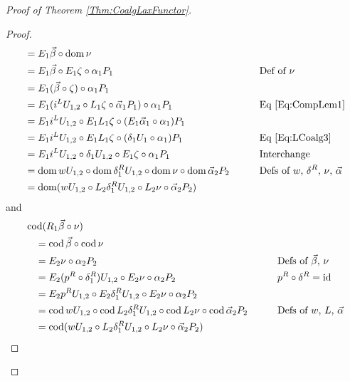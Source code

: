 \begin{proof}[Proof of Theorem \ref{Thm:CoalgLaxFunctor}]
\begin{proof}
\begin{alignat*}{2}
			&= E_1\vec{\beta} \circ \operatorname{dom}\nu && \\
			&= E_1\vec{\beta} \circ E_1\zeta \circ \alpha_1P_1
				&& \text{Def of $\nu$} \\
			&= E_1(\vec{\beta}\circ\zeta) \circ \alpha_1P_1 && \\
			&= E_1(i^LU_{1,2} \circ L_1\zeta \circ \vec{\alpha}_1P_1) \circ \alpha_1P_1
				&& \text{Eq \eqref{Eq:CompLem1}} \\
			&= E_1i^LU_{1,2} \circ E_1L_1\zeta \circ (E_1\vec{\alpha}_1\circ\alpha_1)P_1 && \\
			&= E_1i^LU_{1,2} \circ E_1L_1\zeta \circ (\delta_1U_1\circ\alpha_1)P_1
				&& \text{Eq \eqref{Eq:LCoalg3}} \\
			&= E_1i^LU_{1,2} \circ \delta_1U_{1,2} \circ E_1\zeta \circ \alpha_1P_1
				&& \text{Interchange} \\
			&= \operatorname{dom} wU_{1,2} \circ \operatorname{dom}\delta_1^RU_{1,2} \circ \operatorname{dom}\nu \circ \operatorname{dom}\vec{\alpha}_2P_2
				&\qquad& \text{Defs of $w$, $\delta^R$, $\nu$, $\vec{\alpha}$} \\
			&= \operatorname{dom} (wU_{1,2} \circ L_2\delta_1^RU_{1,2} \circ L_2\nu \circ \vec{\alpha}_2P_2)
		\end{alignat*}
		and
		\begin{alignat*}{2}
			\hspace{1em}&\hspace{-1em} \operatorname{cod}(R_1\vec{\beta} \circ \nu) && \\
			&= \operatorname{cod}\vec{\beta} \circ \operatorname{cod}\nu && \\
			&= E_2\nu \circ \alpha_2P_2
				&& \text{Defs of $\vec{\beta}$, $\nu$} \\
			&= E_2(p^R\circ\delta_1^R)U_{1,2} \circ E_2\nu \circ \alpha_2P_2
				&& p^R\circ\delta^R = \operatorname{id} \\
			&= E_2p^RU_{1,2} \circ E_2\delta_1^RU_{1,2} \circ E_2\nu \circ \alpha_2P_2 && \\
			&= \operatorname{cod} wU_{1,2} \circ \operatorname{cod} L_2\delta_1^RU_{1,2} \circ \operatorname{cod} L_2\nu \circ \operatorname{cod}\vec{\alpha}_2P_2
				&\qquad& \text{Defs of $w$, $L$, $\vec{\alpha}$} \\
			&= \operatorname{cod}(wU_{1,2} \circ L_2\delta_1^RU_{1,2} \circ L_2\nu \circ \vec{\alpha}_2P_2)
		\end{alignat*}
	\end{proof}


\end{proof}
